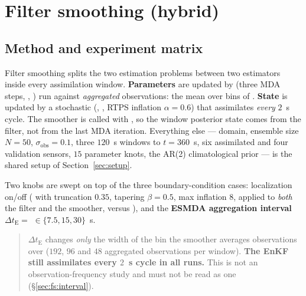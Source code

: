 \begingroup
\sloppy

\section{Filter smoothing (hybrid)}
\label{sec:fs}



\subsection{Method and experiment matrix}
\label{sec:fs:matrix}

Filter smoothing splits the two estimation problems between two estimators
inside every assimilation window. \textbf{Parameters} are updated by
 (three MDA steps, ,
) run against \emph{aggregated}
observations: the mean over bins of .
\textbf{State} is updated by a stochastic 
(, , RTPS inflation
$\alpha = 0.6$) that assimilates \emph{every} $2$~s cycle. The smoother is
called with , so the window posterior state comes
from the filter, not from the last MDA iteration. Everything else --- domain,
ensemble size $N = 50$, $\sigma_{\mathrm{obs}} = 0.1$, three $120$~s windows to
$t = 360$~s, six assimilated and four validation sensors, $15$ parameter knots,
the AR(2) climatological prior --- is the shared setup of Section~\ref{sec:setup}.

Two knobs are swept on top of the three boundary-condition cases: localization
on/off ( with truncation $0.35$, tapering $\beta = 0.5$,
max inflation $8$, applied to \emph{both} the filter and the smoother, versus
), and the \textbf{ESMDA aggregation interval}
$\Delta t_{\mathrm{E}} = $  $\in \{7.5, 15,
30\}$~s.

\begin{quote}
\textbf{} $\Delta t_{\mathrm{E}}$ changes
\emph{only} the width of the bin the smoother averages observations over ($192$,
$96$ and $48$ aggregated observations per window). \textbf{The EnKF still
assimilates every $2$~s cycle in all \HybNumRuns{} runs.} This is not an
observation-frequency study and must not be read as one
(\S\ref{sec:fs:interval}).
\end{quote}

